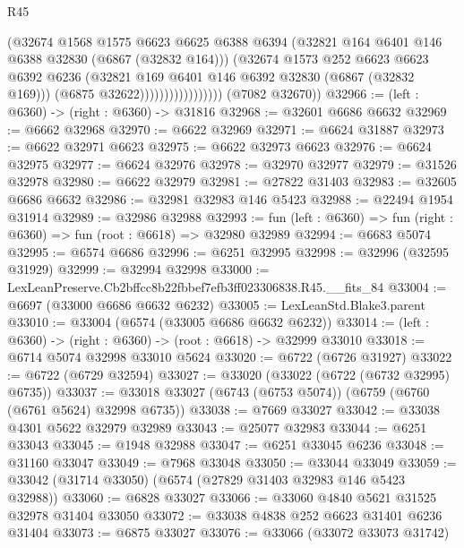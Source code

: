 \begin{lexlean}{R45}
\begin{coremodule}
{                                  (@32674
                                    @1568
                                    @1575
                                    @6623
                                    @6625
                                    @6388
                                    @6394
                                    (@32821 @164 @6401 @146 @6388 @32830 (@6867 (@32832 @164)))
                                    (@32674
                                      @1573
                                      @252
                                      @6623
                                      @6623
                                      @6392
                                      @6236
                                      (@32821 @169 @6401 @146 @6392 @32830 (@6867 (@32832 @169)))
                                      (@6875 @32622)))))))))))))))))
      (@7082 @32670))
@32966 := (left : @6360) -> (right : @6360) -> @31816
@32968 := @32601 @6686 @6632
@32969 := @6662 @32968
@32970 := @6622 @32969
@32971 := @6624 @31887
@32973 := @6622 @32971 @6623
@32975 := @6622 @32973 @6623
@32976 := @6624 @32975
@32977 := @6624 @32976
@32978 := @32970 @32977
@32979 := @31526 @32978
@32980 := @6622 @32979
@32981 := @27822 @31403
@32983 := @32605 @6686 @6632
@32986 := @32981 @32983 @146 @5423
@32988 := @22494 @1954 @31914
@32989 := @32986 @32988
@32993 := fun (left : @6360) => fun (right : @6360) => fun (root : @6618) => @32980 @32989
@32994 := @6683 @5074
@32995 := @6574 @6686
@32996 := @6251 @32995
@32998 := @32996 (@32595 @31929)
@32999 := @32994 @32998
@33000 := LexLeanPreserve.Cb2bffcc8b22fbbef7efb3ff023306838.R45.__fits_84
@33004 := @6697 (@33000 @6686 @6632 @6232)
@33005 := LexLeanStd.Blake3.parent
@33010 := @33004 (@6574 (@33005 @6686 @6632 @6232))
@33014 := (left : @6360) -> (right : @6360) -> (root : @6618) -> @32999 @33010
@33018 := @6714 @5074 @32998 @33010 @5624
@33020 := @6722 (@6726 @31927)
@33022 := @6722 (@6729 @32594)
@33027 := @33020 (@33022 (@6722 (@6732 @32995) @6735))
@33037 := @33018 @33027 (@6743 (@6753 @5074)) (@6759 (@6760 (@6761 @5624) @32998 @6735))
@33038 := @7669 @33027
@33042 := @33038 @4301 @5622 @32979 @32989
@33043 := @25077 @32983
@33044 := @6251 @33043
@33045 := @1948 @32988
@33047 := @6251 @33045 @6236
@33048 := @31160 @33047
@33049 := @7968 @33048
@33050 := @33044 @33049
@33059 := @33042 (@31714 @33050) (@6574 (@27829 @31403 @32983 @146 @5423 @32988))
@33060 := @6828 @33027
@33066 := @33060 @4840 @5621 @31525 @32978 @31404 @33050
@33072 := @33038 @4838 @252 @6623 @31401 @6236 @31404
@33073 := @6875 @33027
@33076 := @33066 (@33072 @33073 @31742)
}
\end{coremodule}
\end{lexlean}
